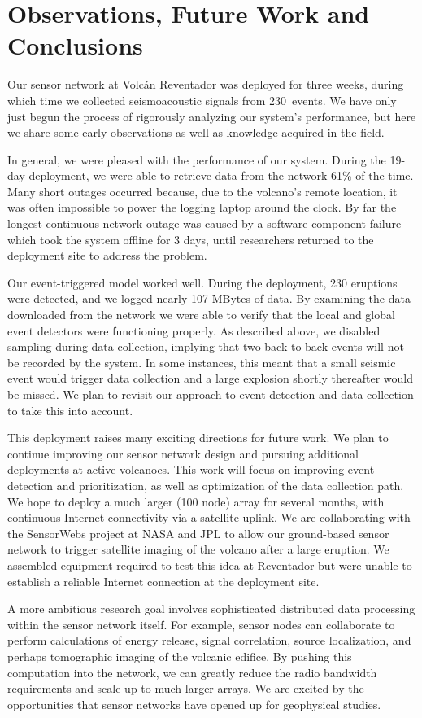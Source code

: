 \section{Observations, Future Work and Conclusions}

Our sensor network at Volc\'{a}n Reventador was deployed for three weeks,
during which time we collected seismoacoustic signals from 230~events. We have
only just begun the process of rigorously analyzing our system's performance,
but here we share some early observations as well as knowledge acquired in
the field.

In general, we were pleased with the performance of our system.  During the
19-day deployment, we were able to retrieve data from the network 61\% of the
time. Many short outages occurred because, due to the volcano's remote
location, it was often impossible to power the logging laptop around the
clock.  By far the longest continuous network outage was caused by a software
component failure which took the system offline for 3 days, until researchers
returned to the deployment site to address the problem.  

Our event-triggered model worked well.  During the deployment, 230 eruptions
were detected, and we logged nearly 107 MBytes of data.  By examining the
data downloaded from the network we were able to verify that the local and
global event detectors were functioning properly. As described above, we
disabled sampling during data collection, implying that two back-to-back
events will not be recorded by the system. In some instances, this meant that
a small seismic event would trigger data collection and a large explosion
shortly thereafter would be missed. We plan to revisit our approach to event
detection and data collection to take this into account.

This deployment raises many exciting directions for future work.  We plan to
continue improving our sensor network design and pursuing additional
deployments at active volcanoes.  This work will focus on improving event
detection and prioritization, as well as optimization of the data collection
path. We hope to deploy a much larger (100 node) array for several months,
with continuous Internet connectivity via a satellite uplink. We are
collaborating with the SensorWebs project at NASA and JPL to allow our
ground-based sensor network to trigger satellite imaging of the volcano after
a large eruption. We assembled equipment required to test this idea at
Reventador but were unable to establish a reliable Internet connection at the
deployment site.

A more ambitious research goal involves sophisticated distributed
data processing within the sensor network itself. For example, sensor
nodes can collaborate to perform calculations of energy release,
signal correlation, source localization, and perhaps tomographic
imaging of the volcanic edifice. By pushing this computation into the
network, we can greatly reduce the radio bandwidth requirements and
scale up to much larger arrays. We are excited by the opportunities
that sensor networks have opened up for geophysical studies.

